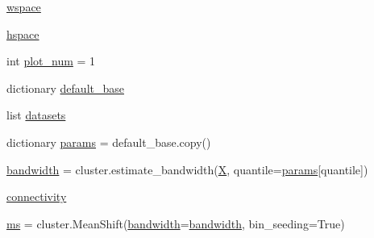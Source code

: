 \begin{DoxyCompactItemize}
\item 
\hyperlink{namespaceStreamClusteringAlgorithms_1_1evoStream_1_1v1_1_1Tests_1_1plot__cluster__comparison_a29c45c5ca682c6a08356c894e0a2b880}{wspace}
\item 
\hyperlink{namespaceStreamClusteringAlgorithms_1_1evoStream_1_1v1_1_1Tests_1_1plot__cluster__comparison_ae92d694309b9401382f147ed651b4200}{hspace}
\item 
int \hyperlink{namespaceStreamClusteringAlgorithms_1_1evoStream_1_1v1_1_1Tests_1_1plot__cluster__comparison_adee4772bf94d9dece0cfebb67e4c2341}{plot\+\_\+num} = 1
\item 
dictionary \hyperlink{namespaceStreamClusteringAlgorithms_1_1evoStream_1_1v1_1_1Tests_1_1plot__cluster__comparison_ae71fb2ad2506744c0008701c03075141}{default\+\_\+base}
\item 
list \hyperlink{namespaceStreamClusteringAlgorithms_1_1evoStream_1_1v1_1_1Tests_1_1plot__cluster__comparison_a06e554b20d98ddd42ac422dfed5e5499}{datasets}
\item 
dictionary \hyperlink{namespaceStreamClusteringAlgorithms_1_1evoStream_1_1v1_1_1Tests_1_1plot__cluster__comparison_a57eaaa643ce4ca6f93e037fd8a49db07}{params} = default\+\_\+base.\+copy()
\item 
\hyperlink{namespaceStreamClusteringAlgorithms_1_1evoStream_1_1v1_1_1Tests_1_1plot__cluster__comparison_aa66d3fcb51b408fd3373b9b2bf7c79bb}{bandwidth} = cluster.\+estimate\+\_\+bandwidth(\hyperlink{namespaceStreamClusteringAlgorithms_1_1evoStream_1_1v1_1_1Tests_1_1plot__cluster__comparison_a6ad26e6b39b93168e30448023f668ee3}{X}, quantile=\hyperlink{namespaceStreamClusteringAlgorithms_1_1evoStream_1_1v1_1_1Tests_1_1plot__cluster__comparison_a57eaaa643ce4ca6f93e037fd8a49db07}{params}\mbox{[}\textquotesingle{}quantile\textquotesingle{}\mbox{]})
\item 
\hyperlink{namespaceStreamClusteringAlgorithms_1_1evoStream_1_1v1_1_1Tests_1_1plot__cluster__comparison_ac3d4b8b91d1c51cfa58d9a23f793323d}{connectivity}
\item 
\hyperlink{namespaceStreamClusteringAlgorithms_1_1evoStream_1_1v1_1_1Tests_1_1plot__cluster__comparison_acc69afe4f0534535051b5d7d2d8a269d}{ms} = cluster.\+Mean\+Shift(\hyperlink{namespaceStreamClusteringAlgorithms_1_1evoStream_1_1v1_1_1Tests_1_1plot__cluster__comparison_aa66d3fcb51b408fd3373b9b2bf7c79bb}{bandwidth}=\hyperlink{namespaceStreamClusteringAlgorithms_1_1evoStream_1_1v1_1_1Tests_1_1plot__cluster__comparison_aa66d3fcb51b408fd3373b9b2bf7c79bb}{bandwidth}, bin\+\_\+seeding=True)
\item 

\end{DoxyCompactItemize}
